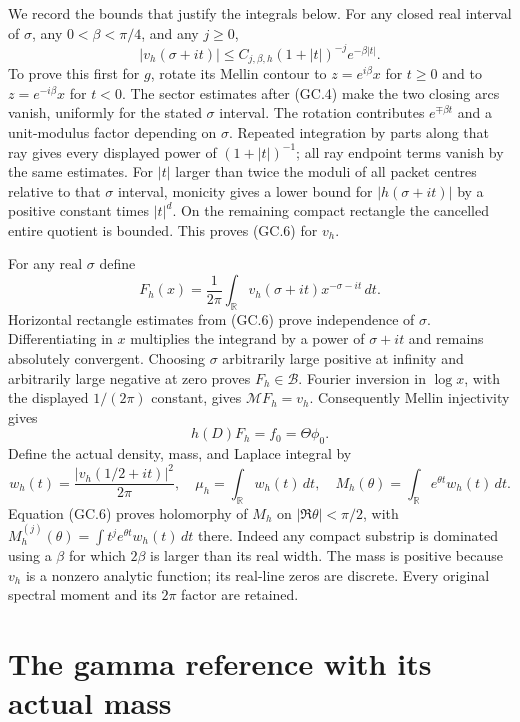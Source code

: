 \documentclass[11pt]{article}
\begin{document}
We record the bounds that justify the integrals below. For any closed
real interval of $\sigma$, any $0<\beta<\pi/4$, and any $j\ge0$,
\[
 |v_h(\sigma+it)|\le C_{j,\beta,h}(1+|t|)^{-j}e^{-\beta|t|}.
                                                               \tag{GC.6}
\]
To prove this first for $g$, rotate its Mellin contour to
$z=e^{i\beta}x$ for $t\ge0$ and to $z=e^{-i\beta}x$ for $t<0$.
The sector estimates after (GC.4) make the two closing arcs vanish,
uniformly for the stated $\sigma$ interval. The rotation contributes
$e^{\mp\beta t}$ and a unit-modulus factor depending on $\sigma$.
Repeated integration by parts along that ray gives every displayed
power of $(1+|t|)^{-1}$; all ray endpoint terms vanish by the same
estimates. For $|t|$ larger than twice the moduli of all packet
centres relative to that $\sigma$ interval, monicity gives a lower
bound for $|h(\sigma+it)|$ by a positive constant times $|t|^d$.
On the remaining compact rectangle the cancelled entire quotient is
bounded. This proves (GC.6) for $v_h$.

For any real $\sigma$ define
\[
 F_h(x)=\frac1{2\pi}\int_{\mathbb R}
              v_h(\sigma+it)x^{-\sigma-it}\,dt.                \tag{GC.7}
\]
Horizontal rectangle estimates from (GC.6) prove independence of
$\sigma$. Differentiating in $x$ multiplies the integrand by a
power of $\sigma+it$ and remains absolutely convergent. Choosing
$\sigma$ arbitrarily large positive at infinity and arbitrarily
large negative at zero proves $F_h\in\mathscr B$. Fourier inversion
in $\log x$, with the displayed $1/(2\pi)$ constant, gives
$\mathcal MF_h=v_h$. Consequently Mellin injectivity gives
\[
 h(D)F_h=f_0=\Theta\phi_0.                                    \tag{GC.8}
\]
Define the actual density, mass, and Laplace integral by
\[
 w_h(t)=\frac{|v_h(1/2+it)|^2}{2\pi},\quad
 \mu_h=\int_{\mathbb R}w_h(t)\,dt,\quad
 M_h(\theta)=\int_{\mathbb R}e^{\theta t}w_h(t)\,dt.
                                                               \tag{GC.9}
\]
Equation (GC.6) proves holomorphy of $M_h$ on
$|\Re\theta|<\pi/2$, with
$M_h^{(j)}(\theta)=\int t^je^{\theta t}w_h(t)\,dt$ there.
Indeed any compact substrip is dominated using a $\beta$ for which
$2\beta$ is larger than its real width. The mass is positive because
$v_h$ is a nonzero analytic function; its real-line zeros are discrete.
Every original spectral moment and its $2\pi$ factor are retained.

\section{The gamma reference with its actual mass}
\end{document}
